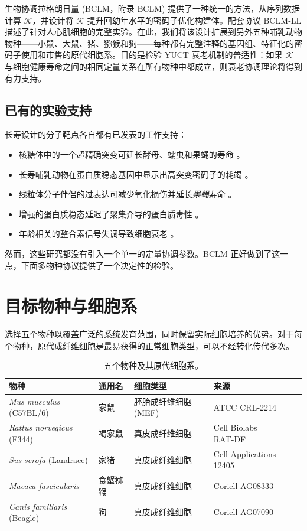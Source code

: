 \documentclass[12pt,a4paper]{article}
\newcommand{\REL}{\mathcal{K}}          %
\begin{document}
	生物协调拉格朗日量 (BCLM，附录 BCLM) 提供了一种统一的方法，从序列数据计算 \(\REL\)，并设计将 \(\REL\) 提升回幼年水平的密码子优化构建体。配套协议 BCLM‑LL 描述了针对人心肌细胞的完整实验。在此，我们将该设计扩展到另外五种哺乳动物物种——小鼠、大鼠、猪、猕猴和狗——每种都有完整注释的基因组、特征化的密码子使用和市售的原代细胞系。目的是检验 YUCT 衰老机制的普适性：如果 \(\REL\) 与细胞健康寿命之间的相同定量关系在所有物种中都成立，则衰老协调理论将得到有力支持。
	
	\subsection{已有的实验支持}
	长寿设计的分子靶点各自都有已发表的工作支持：
	\begin{itemize}
		\item 核糖体中的一个超精确突变可延长酵母、蠕虫和果蝇的寿命 \cite{Bjedov2021}。
		\item 长寿哺乳动物在蛋白质稳态基因中显示出高突变密码子的耗竭 \cite{Kerekes2025}。
		\item 线粒体分子伴侣的过表达可减少氧化损伤并延长\textit{果蝇}寿命 \cite{Morrow2004}。
		\item 增强的蛋白质稳态延迟了聚集介导的蛋白质毒性 \cite{Walker2003}。
		\item 年龄相关的整合素信号失调导致细胞衰老 \cite{Takeda2019}。
	\end{itemize}
	然而，这些研究都没有引入一个单一的定量协调参数。BCLM 正好做到了这一点，下面多物种协议提供了一个决定性的检验。
	
	\section{目标物种与细胞系}
	\label{sec:species}
	选择五个物种以覆盖广泛的系统发育范围，同时保留实际细胞培养的优势。对于每个物种，原代成纤维细胞是最易获得的正常细胞类型，可以不经转化传代多次。
	
	\begin{table}[H]
		\centering
		\caption{五个物种及其原代细胞系。}
		\label{tab:species}
		\begin{tabular}{@{}lllll@{}}
			\toprule
			\textbf{物种} & \textbf{通用名} & \textbf{细胞类型} & \textbf{来源} \\
			\midrule
			\textit{Mus musculus} (C57BL/6) & 家鼠 & 胚胎成纤维细胞 (MEF) & ATCC CRL‑2214 \\
			\textit{Rattus norvegicus} (F344) & 褐家鼠 & 真皮成纤维细胞 & Cell Biolabs RAT‑DF \\
			\textit{Sus scrofa} (Landrace) & 家猪 & 真皮成纤维细胞 & Cell Applications 12405 \\
			\textit{Macaca fascicularis} & 食蟹猕猴 & 真皮成纤维细胞 & Coriell AG08333 \\
			\textit{Canis familiaris} (Beagle) & 狗 & 真皮成纤维细胞 & Coriell AG07090 \\
			\bottomrule
		\end{tabular}
	\end{table}
	
\end{document}
